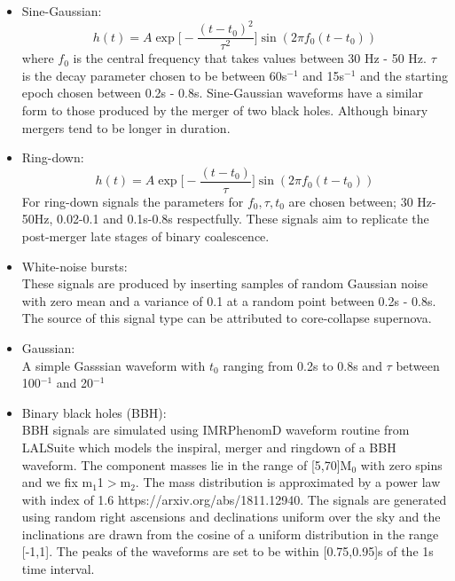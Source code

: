 \documentclass[12pt]{iopart}
\begin{document}
\begin{itemize}
	\item Sine-Gaussian:
		\begin{equation}
		\label{eqn:sg}
			h(t) = A \exp\bigg[ - \frac{(t-t_{0})^2}{\tau^2} \bigg] \sin (2 \pi f_0 (t-t_0))
		\end{equation}	
		where $f_0$ is the central frequency that takes values between 30 Hz - 50 Hz. $\tau$ is the decay parameter chosen to be between 60s$^{-1}$  and 15s$^{-1}$ and the starting epoch chosen between 0.2s - 0.8s. Sine-Gaussian waveforms have a similar form to those produced by the merger of two black holes. Although binary mergers tend to be longer in duration.  		
	\item Ring-down:
		\begin{equation}
			h(t) = A \exp \bigg[-\frac{(t-t_0)}{\tau}\bigg]\sin(2 \pi f_0 (t-t_0))
		\end{equation}
		For ring-down signals the parameters for $f_0, \tau, t_0$ are chosen between; 30 Hz-50Hz, 0.02-0.1 and 0.1s-0.8s respectfully. These signals aim to replicate the post-merger late stages of binary coalescence.
	\item White-noise bursts:\hfill \\
	These signals are produced by inserting samples of random Gaussian noise with zero mean and a variance of 0.1 at a random point between 0.2s - 0.8s. The source of this signal type can be attributed to core-collapse supernova. 
	\item Gaussian:\\
	A simple Gasssian waveform with $t_0$ ranging from 0.2s to 0.8s and $\tau$ between  100$^{-1}$ and 20$^{-1}$
	\item Binary black holes (BBH): \\
	BBH signals are simulated using IMRPhenomD waveform routine from LALSuite which models the inspiral, merger and ringdown of a BBH waveform. The component masses lie in the range of [5,70]M$_0$ with zero spins and we fix m$_1$1$>$m$_2$. The mass distribution is approximated by a power law with index of 1.6 https://arxiv.org/abs/1811.12940. The signals are generated using random right ascensions and declinations uniform over the sky and the inclinations are drawn from the cosine of a uniform distribution in the range [-1,1]. The peaks of the waveforms are set to be within [0.75,0.95]s of the 1s time interval. 
\end{itemize}
\end{document}
